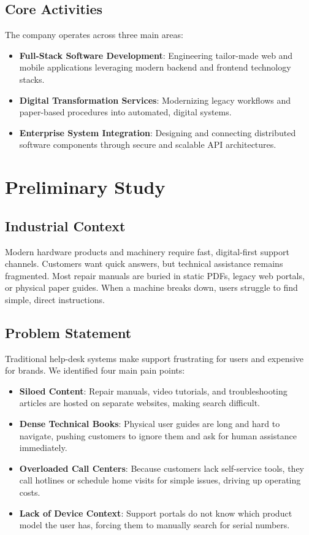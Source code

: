 \documentclass[12pt,a4paper]{report}
\begin{document}
\subsection{Core Activities}

The company operates across three main areas:
\begin{itemize}
    \item \textbf{Full-Stack Software Development}: Engineering tailor-made web and mobile applications leveraging modern backend and frontend technology stacks.
    \item \textbf{Digital Transformation Services}: Modernizing legacy workflows and paper-based procedures into automated, digital systems.
    \item \textbf{Enterprise System Integration}: Designing and connecting distributed software components through secure and scalable API architectures.
\end{itemize}

\section{Preliminary Study}

\subsection{Industrial Context}

Modern hardware products and machinery require fast, digital-first support channels. Customers want quick answers, but technical assistance remains fragmented. Most repair manuals are buried in static PDFs, legacy web portals, or physical paper guides. When a machine breaks down, users struggle to find simple, direct instructions.

\subsection{Problem Statement}

Traditional help-desk systems make support frustrating for users and expensive for brands. We identified four main pain points:
\begin{itemize}
    \item \textbf{Siloed Content}: Repair manuals, video tutorials, and troubleshooting articles are hosted on separate websites, making search difficult.
    \item \textbf{Dense Technical Books}: Physical user guides are long and hard to navigate, pushing customers to ignore them and ask for human assistance immediately.
    \item \textbf{Overloaded Call Centers}: Because customers lack self-service tools, they call hotlines or schedule home visits for simple issues, driving up operating costs.
    \item \textbf{Lack of Device Context}: Support portals do not know which product model the user has, forcing them to manually search for serial numbers.
\end{itemize}
\end{document}
